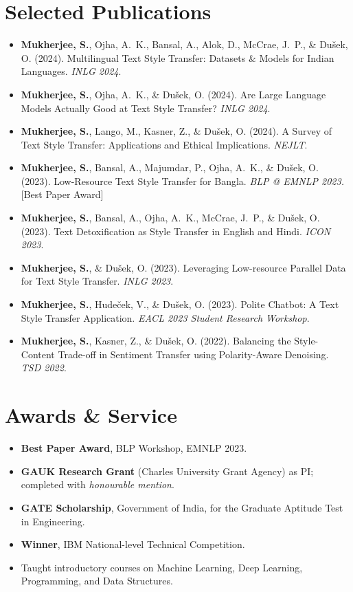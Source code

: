 \documentclass[10.5pt,a4paper]{article}
\newenvironment{tightitem}{%
  \begin{itemize}[leftmargin=1.05em, topsep=1pt, partopsep=0pt, itemsep=1pt, parsep=0pt]
}{\end{itemize}}
\begin{document}
\section*{Selected Publications}
\begin{tightitem}
  \item \textbf{Mukherjee, S.}, Ojha, A.~K., Bansal, A., Alok, D., McCrae, J.~P., \& Du\v{s}ek, O. (2024). Multilingual Text Style Transfer: Datasets \& Models for Indian Languages. \emph{INLG 2024}.
  \item \textbf{Mukherjee, S.}, Ojha, A.~K., \& Du\v{s}ek, O. (2024). Are Large Language Models Actually Good at Text Style Transfer? \emph{INLG 2024}.
  \item \textbf{Mukherjee, S.}, Lango, M., Kasner, Z., \& Du\v{s}ek, O. (2024). A Survey of Text Style Transfer: Applications and Ethical Implications. \emph{NEJLT}.
  \item \textbf{Mukherjee, S.}, Bansal, A., Majumdar, P., Ojha, A.~K., \& Du\v{s}ek, O. (2023). Low-Resource Text Style Transfer for Bangla. \emph{BLP @ EMNLP 2023.} \,\textcolor{accent}{[Best Paper Award]}
  \item \textbf{Mukherjee, S.}, Bansal, A., Ojha, A.~K., McCrae, J.~P., \& Du\v{s}ek, O. (2023). Text Detoxification as Style Transfer in English and Hindi. \emph{ICON 2023}.
  \item \textbf{Mukherjee, S.}, \& Du\v{s}ek, O. (2023). Leveraging Low-resource Parallel Data for Text Style Transfer. \emph{INLG 2023}.
  \item \textbf{Mukherjee, S.}, Hude\v{c}ek, V., \& Du\v{s}ek, O. (2023). Polite Chatbot: A Text Style Transfer Application. \emph{EACL 2023 Student Research Workshop}.
  \item \textbf{Mukherjee, S.}, Kasner, Z., \& Du\v{s}ek, O. (2022). Balancing the Style-Content Trade-off in Sentiment Transfer using Polarity-Aware Denoising. \emph{TSD 2022}.
\end{tightitem}

\section*{Awards \& Service}
\begin{tightitem}
  \item \textbf{Best Paper Award}, BLP Workshop, EMNLP 2023.
  \item \textbf{GAUK Research Grant} (Charles University Grant Agency) as PI; completed with \emph{honourable mention}.
  \item \textbf{GATE Scholarship}, Government of India, for the Graduate Aptitude Test in Engineering.
  \item \textbf{Winner}, IBM National-level Technical Competition.
  \item Taught introductory courses on Machine Learning, Deep Learning, Programming, and Data Structures.
\end{tightitem}
\end{document}
